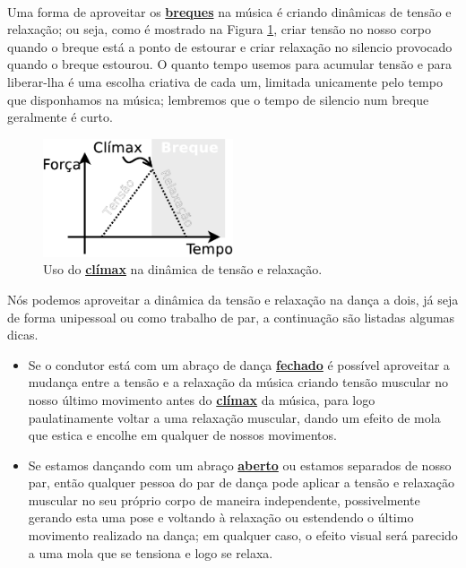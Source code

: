 ~


Uma forma de aproveitar os \hyperref[sec:UsandoBreak]{\textbf{breques}} na música 
é criando dinâmicas de tensão e relaxação;
ou seja,
como é mostrado na Figura \ref{fig:tension-release-climax}, 
criar tensão no nosso corpo quando o breque está a ponto de estourar 
e criar relaxação no silencio provocado quando o breque estourou.
O quanto tempo usemos para acumular tensão e para liberar-lha 
é uma escolha criativa de cada um, 
limitada unicamente pelo tempo que disponhamos na música;
lembremos que o tempo de silencio num breque geralmente é curto.



\begin{figure}[!h]
  \centering
    \includegraphics[width=0.5\textwidth]{chapters/cap-musicalidade/tension-release-climax.eps}
\caption{Uso do \hyperref[ref:climax]{\textbf{clímax}} na dinâmica de tensão e relaxação.}
\label{fig:tension-release-climax}
\end{figure}



Nós podemos aproveitar a dinâmica da tensão e relaxação na dança a dois,
já seja de forma unipessoal ou como trabalho de par,
a continuação são listadas algumas dicas.
\begin{itemize}
\item Se o condutor está com um abraço de dança \hyperref[def:closed-position]{\textbf{fechado}} 
é possível aproveitar a mudança entre a tensão e a relaxação da música 
criando tensão muscular no nosso último movimento antes do \hyperref[ref:climax]{\textbf{clímax}} da música,
para logo paulatinamente voltar a uma relaxação muscular,
dando um efeito de mola que estica e encolhe em qualquer de nossos movimentos.
\item Se estamos dançando com um abraço \hyperref[def:open-position]{\textbf{aberto}} 
ou estamos separados de nosso par, 
então qualquer pessoa do par de dança pode aplicar a tensão e relaxação muscular 
no seu próprio corpo de maneira independente, 
possivelmente gerando esta uma pose e voltando à relaxação 
ou estendendo o último movimento realizado na dança;
em qualquer caso, o efeito visual será parecido a uma mola que se tensiona e logo se relaxa.
\end{itemize}



